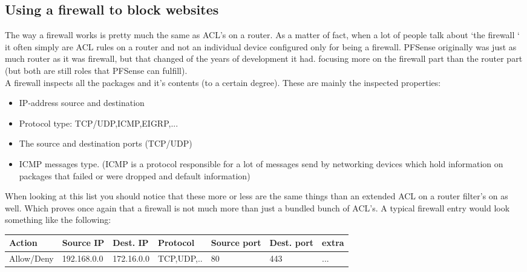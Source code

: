 \subsection{Using a firewall to block websites}
The way a firewall works is pretty much the same as ACL's on a router. As a matter of fact, when a lot of people talk about `the firewall ` it often simply are ACL rules on a router and not an individual device configured only for being a firewall. PFSense originally was just as much router as it was firewall, but that changed of the years of development it had. focusing more on the firewall part than the router part (but both are still roles that PFSense can fulfill).\\
A firewall inspects all the packages and it's contents (to a certain degree). These are mainly the inspected properties:
\begin{itemize}
\item IP-address source and destination
\item Protocol type: TCP/UDP,ICMP,EIGRP,...
\item The source and destination ports (TCP/UDP)
\item ICMP messages type. (ICMP is a protocol responsible for a lot of messages send by networking devices which hold information on packages that failed or were dropped and default information)
\end{itemize}
When looking at this list you should notice that these more or less are the same things than an extended ACL on a router filter's on as well. Which proves once again that a firewall is not much more than just a bundled bunch of ACL's. A typical firewall entry would look something like the following:\\

\begin{tabu} to \textwidth { | X[l] | X[l] |X[l] |X[l] |X[l] |X[l] |X[l] | } 
\hline

\textbf{ Action}& \textbf{Source IP} & \textbf{ Dest. IP} & \textbf{ Protocol} & \textbf{Source port} & \textbf{ Dest. port} & \textbf{extra} \\ 
\hline
\small Allow/Deny& \small 192.168.0.0  & \small  172.16.0.0 & \small  TCP,UDP,.. & \small  80 & \small  443 & ... \\ 
\hline
\end{tabu}
\\

